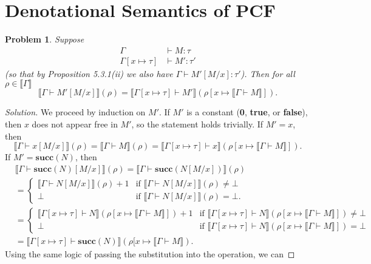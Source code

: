 \documentclass{article}
\newtheorem{problem}{Problem}[section]}
\newcommand{\den}[1]{\llbracket #1 \rrbracket}
\begin{document}
\section{Denotational Semantics of PCF}
\begin{problem}
    Suppose
    \begin{align*}
        \Gamma &\vdash M:\tau \\
        \Gamma[x\mapsto\tau] &\vdash M':\tau'
    \end{align*}
    (so that by Proposition 5.3.1(ii) we also have $\Gamma\vdash M'[M/x] :
    \tau'$). Then for all $\rho\in\den{\Gamma}$
    \[
        \den{\Gamma\vdash M'[M/x]}(\rho) = \den{\Gamma[x\mapsto\tau] \vdash
        M'}(\rho[x\mapsto\den{\Gamma\vdash M}]).
    \]
\end{problem}
\begin{proof}[Solution]
    We proceed by induction on $M'$. If $M'$ is a constant (\textbf{0},
    \textbf{true}, or \textbf{false}), then $x$ does not appear free in $M'$, so
    the statement holds trivially. If $M'=x$, then
    \[
        \den{\Gamma\vdash x[M/x]}(\rho) = \den{\Gamma\vdash M}(\rho) =
        \den{\Gamma[x\mapsto\tau] \vdash x}(\rho[x\mapsto\den{\Gamma\vdash M}]).
    \]
    If $M'=\textbf{succ}(N)$, then
    \begin{align*}
        &\den{\Gamma\vdash \textbf{succ}(N)[M/x]}(\rho) = \den{\Gamma\vdash
        \textbf{succ}(N[M/x])}(\rho) \\
        &= \begin{cases}
            \den{\Gamma\vdash N[M/x]}(\rho) + 1 & \text{if }
            \den{\Gamma\vdash N[M/x]}(\rho) \neq\bot \\
            \bot & \text{if }\den{\Gamma\vdash N[M/x]}(\rho) = \bot.
        \end{cases} \\
        &= \begin{cases}
            \den{\Gamma[x\mapsto\tau]\vdash N}(\rho[x\mapsto\den{\Gamma\vdash
            M}]) + 1 & \text{if } \den{\Gamma[x\mapsto\tau]\vdash
            N}(\rho[x\mapsto\den{\Gamma\vdash M}]) \neq\bot \\
            \bot & \text{if }\den{\Gamma[x\mapsto\tau]\vdash
            N}(\rho[x\mapsto\den{\Gamma \vdash M}]) = \bot
        \end{cases} \\
        &= \den{\Gamma[x\mapsto\tau]\vdash \textbf{succ}(N)}(\rho
        [x\mapsto\den{\Gamma\vdash M}).
    \end{align*}
    Using the same logic of passing the substitution into the operation, we can

\end{proof}
\end{document}
